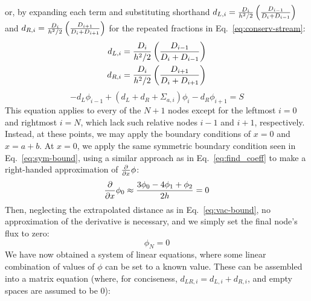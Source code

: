 \documentclass[12pt]{article}
\begin{document}
\newcommand{\dL}[1]{d_{L,#1}}
\newcommand{\dR}[1]{d_{R,#1}}
\newcommand{\dLR}[1]{d_{LR,#1}}
or, by expanding each term and substituting shorthand $\dL{i}=\frac{D_i}{h^2/2}\mfrac$ and $\dR{i}=\frac{D_i}{h^2/2}\pfrac$ for the repeated fractions in Eq.~\ref{eq:conserv-stream}:
\begin{equation}
    \label{eq:shorthand}
    \begin{split}
        \dL{i}&=\frac{D_i}{h^2/2}\mfrac\\
        \dR{i}&=\frac{D_i}{h^2/2}\pfrac
    \end{split}
\end{equation}
\begin{equation}
    \label{eq:center-findiff}
    -d_L\phi_{i-1} + \left(d_L+d_R+\Sigma_{a,i}\right)\phi_i - d_R\phi_{i+1} = S
\end{equation}
This equation applies to every of the $N+1$ nodes except for the leftmost $i=0$ and rightmost $i=N$, which lack such relative nodes $i-1$ and $i+1$, respectively.
Instead, at these points, we may apply the boundary conditions of $x=0$ and $x=a+b$.
At $x=0$, we apply the same symmetric boundary condition seen in Eq.~\ref{eq:sym-bound}, using a similar approach as in Eq.~\ref{eq:find_coeff} to make a right-handed approximation of $\frac{\partial}{\partial x}\phi$:
\begin{equation}
    \label{eq:sym-findiff}
    \frac{\partial}{\partial x}\phi_0 \approx \frac{3\phi_0-4\phi_1+\phi_2}{2h}=0
\end{equation}
Then, neglecting the extrapolated distance as in Eq.~\ref{eq:vac-bound}, no approximation of the derivative is necessary, and we simply set the final node's flux to zero:
\begin{equation}
    \label{eq:vac-findiff}
    \phi_N = 0
\end{equation}
We have now obtained a system of linear equations, where some linear combination of values of $\phi$ can be set to a known value.
These can be assembled into a matrix equation (where, for conciseness, $\dLR{i}=\dL{i}+\dR{i}$, and empty spaces are assumed to be 0):
\end{document}
